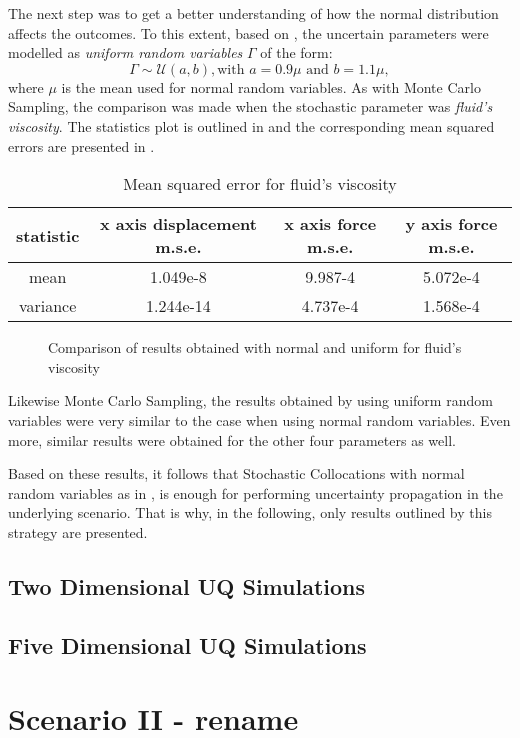 	The next step was to get a better understanding of how the normal distribution affects the outcomes. To this extent, based on , the uncertain parameters were modelled as \emph{uniform random variables} $\Gamma$ of the form:
\begin{equation} \label{1DSCUniform}
\Gamma \sim \mathcal{U}(a, b), \text{with } a = 0.9\mu \text{ and } b = 1.1\mu, 
\end{equation}
where $\mu$	is the mean used for normal random variables. As with Monte Carlo Sampling, the comparison was made when the stochastic parameter was \emph{fluid's viscosity}. The statistics plot is outlined in  and the corresponding mean squared errors are presented in .
\begin{table}[h!]
\centering
 \begin{tabular}{|c|c|c|c|} 
 \hline
 statistic & x axis displacement m.s.e. & x axis force m.s.e. & y axis force m.s.e. \\
 \hline 
 mean & 1.049e-8 & 9.987-4 & 5.072e-4 \\
 \hline 
 variance & 1.244e-14 & 4.737e-4 & 1.568e-4 \\
  \hline
 \end{tabular}
 \caption{Mean squared error for fluid's viscosity}
 \label{table:SCS_nor_uni_mse}
\end{table}
\begin{figure}[htbp]
  \centering
  \hfill
  \caption{Comparison of results obtained with normal and uniform for fluid's viscosity}
  \label{SCS_com}
  \vspace{-0.4cm}
\end{figure}
Likewise Monte Carlo Sampling, the results obtained by using uniform random variables were very similar to the case when using normal random variables. Even more, similar results were obtained for the other four parameters as well. 

	Based on these results, it follows that Stochastic Collocations with normal random variables as in , is enough for performing uncertainty propagation in the underlying scenario. That is why, in the following, only results outlined by this strategy are presented. 
\subsection{Two Dimensional UQ Simulations}
\label{subsec:2D UQ Simulations}

\subsection{Five Dimensional UQ Simulations}
\label{5D UQ Simulations}

\section{Scenario II - rename}
\label{Scenario II}




